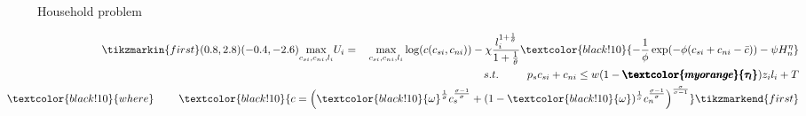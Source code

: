 \documentclass[11pt,aspectratio=169]{beamer}
\newcommand{\tr}[1]{\textcolor{blue}{#1}}
\begin{document}
	\begin{frame}{Household problem} %
		\vspace{2mm}
		\begin{minipage}[t!]{1\textwidth}
			\begin{align*}
			\tikzmarkin{first}(0.8,2.8)(-0.4,-2.6)
			\underset{c_{si},c_{ni}, l_i}{\max} U_i=\ \hspace{2mm} \underset{c_{si},c_{ni}, l_i}{\max} \log(c(c_{si},c_{ni}))-\chi\frac{l_i^{1+\frac{1}{\theta}}}{1+\frac{1}{\theta}}  \textcolor{black!10}{-\frac{1}{\phi}\exp(-\phi(c_{si}+c_{ni}-\bar{c})) -\psi H_n^\eta}\\
			s.t.\ \hspace{6mm}  \hspace{2mm }p_{s}c_{si}+c_{ni}\leq w(1-\pmb{\textcolor{myorange}{\tau_l}})z_il_i+T%
			\\	\hspace{-10mm} \textcolor{black!10}{where} \hspace{8mm}\textcolor{black!10}{c =
				\left(\textcolor{black!10}{\omega}^{\frac{1}{\sigma}}c_{s}^{\frac{\sigma-1}{\sigma}}+(1-\textcolor{black!10}{\omega})^{\frac{1}{\sigma}}c_{n}^{\frac{\sigma-1}{\sigma}}\right)^{\frac{\sigma}{\sigma-1}}}%
			\tikzmarkend{first}
			\end{align*}
		\end{minipage}
		
		

\end{frame}
\end{document}
